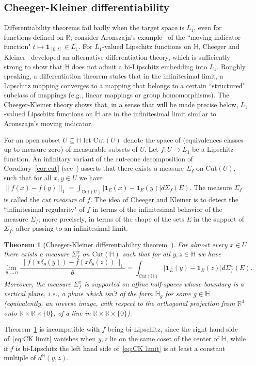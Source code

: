 \documentclass{icm2010}
\newtheorem{theorem}{Theorem}[section]
\theoremstyle{definition}
\newcommand{\R}{\mathbb{R}}
\newcommand{\1}{\mathbf{1}}
\renewcommand{\H}{\mathbb{H}}
\newcommand{\Cut}{\mathrm{Cut}}
\begin{document}
\subsection{Cheeger-Kleiner differentiability}\label{sec:CK}
Differentiability theorems fail badly when the target space is
$L_1$, even for functions defined on $\R$; consider Aronszajn's
example~\cite{aronszajn} of the ``moving indicator function"
$t\mapsto \1_{[0,t]}\in L_1$. For $L_1$-valued Lipschitz functions
on $\H$, Cheeger and Kleiner~\cite{ckbv,ckmetmon} developed an
alternative differentiation theory, which is sufficiently strong to
show that $\H$ does not admit a bi-Lipschitz embedding into $L_1$.
Roughly speaking, a differentiation theorem states that in the
infinitesimal limit, a Lipschitz mapping converges to a mapping that
belongs to a certain ``structured" subclass of mappings (e.g.,
linear mappings or group homomorphisms). The Cheeger-Kleiner theory
shows that, in a sense that will be made precise below, $L_1$-valued
Lipschitz functions on $\H$ are in the infinitesimal limit similar
to Aronszajn's moving indicator.

For an open subset $U\subseteq \H$ let $\Cut(U)$ denote the space of
(equivalences classes up to measure zero) of measurable subsets of
$U$. Let $f:U\to L_1$ be a Lipschitz function. An infinitary variant
of the cut-cone decomposition of Corollary~\ref{cor:cut}
(see~\cite{ckbv}) asserts that there exists a measure $\Sigma_f$ on
$\Cut(U)$, such that for all $x,y\in U$ we have
$\|f(x)-f(y)\|_1=\int_{\Cut(U)}|\1_E(x)-\1_E(y)|d\Sigma_f(E)$. The
measure $\Sigma_f$ is called the {\em cut measure} of $f$. The idea
of Cheeger and Kleiner is to detect the ``infinitesimal regularity"
of $f$ in terms of the infinitesimal behavior of the measure
$\Sigma_f$; more precisely, in terms of the shape of the sets $E$ in
the support of $\Sigma_f$, after passing to an infinitesimal limit.

\begin{theorem}[Cheeger-Kleiner differentiability
theorem~\cite{ckbv,ckmetmon}]\label{thm:CKBV} For almost every $x\in
U$ there exists a measure $\Sigma_f^x$ on $\Cut(\H)$  such that for
all $y,z\in \H$ we have
\begin{equation}\label{eq:CK limit}
\lim_{\theta\to 0}
\frac{\|f(x\delta_\theta(y))-f(x\delta_\theta(z))\|_1}{\theta}=\int_{\Cut(\H)}|\1_E(y)-\1_E(z)|d\Sigma_f^x(E).
\end{equation}
Moreover, the measure $\Sigma_f^x$ is supported on affine
half-spaces whose boundary is a vertical plane, i.e., a plane which
isn't of the form $\H_g$ for some $g\in \H$ (equivalently, an
inverse image, with respect to the orthogonal projection from $\R^3$
onto  $\R\times\R\times \{0\}$, of a line in $\R\times\R\times
\{0\}$).
\end{theorem}
Theorem~\ref{thm:CKBV} is incompatible with $f$ being bi-Lipschitz,
since the right hand side of~\eqref{eq:CK limit} vanishes when $y,z$
lie on the same coset of the center of $\H$, while if $f$ is
bi-Lipschitz the left hand side of~\eqref{eq:CK limit} is at least a
constant multiple of $d^\H(y,z)$.
\end{document}
